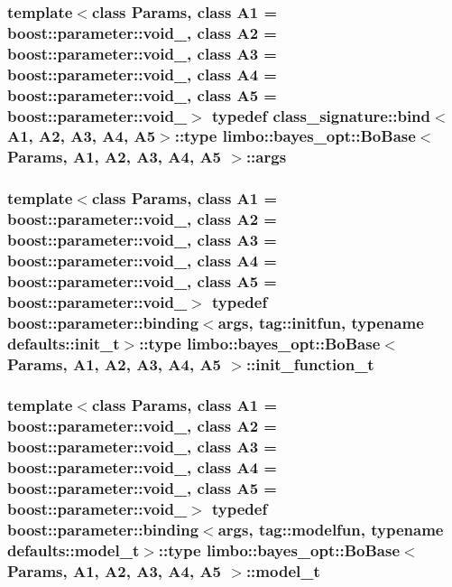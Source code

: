 \subsubsection[{args}]{\setlength{\rightskip}{0pt plus 5cm}template$<$class Params, class A1 = boost\+::parameter\+::void\+\_\+, class A2 = boost\+::parameter\+::void\+\_\+, class A3 = boost\+::parameter\+::void\+\_\+, class A4 = boost\+::parameter\+::void\+\_\+, class A5 = boost\+::parameter\+::void\+\_\+$>$ typedef class\+\_\+signature\+::bind$<$A1, A2, A3, A4, A5$>$\+::type {\bf limbo\+::bayes\+\_\+opt\+::\+Bo\+Base}$<$ Params, A1, A2, A3, A4, A5 $>$\+::{\bf args}}\label{classlimbo_1_1bayes__opt_1_1_bo_base_a75c1ae9e7268016c6f767c56bcede7d2}
\hypertarget{classlimbo_1_1bayes__opt_1_1_bo_base_aa4cf2b36051de6b46e75621f0b9ed642}{}
\subsubsection[{init\+\_\+function\+\_\+t}]{\setlength{\rightskip}{0pt plus 5cm}template$<$class Params, class A1 = boost\+::parameter\+::void\+\_\+, class A2 = boost\+::parameter\+::void\+\_\+, class A3 = boost\+::parameter\+::void\+\_\+, class A4 = boost\+::parameter\+::void\+\_\+, class A5 = boost\+::parameter\+::void\+\_\+$>$ typedef boost\+::parameter\+::binding$<${\bf args}, tag\+::initfun, typename {\bf defaults\+::init\+\_\+t}$>$\+::type {\bf limbo\+::bayes\+\_\+opt\+::\+Bo\+Base}$<$ Params, A1, A2, A3, A4, A5 $>$\+::{\bf init\+\_\+function\+\_\+t}}\label{classlimbo_1_1bayes__opt_1_1_bo_base_aa4cf2b36051de6b46e75621f0b9ed642}
\hypertarget{classlimbo_1_1bayes__opt_1_1_bo_base_a1ddc93cc023a2d7d527deb4cc750624e}{}
\subsubsection[{model\+\_\+t}]{\setlength{\rightskip}{0pt plus 5cm}template$<$class Params, class A1 = boost\+::parameter\+::void\+\_\+, class A2 = boost\+::parameter\+::void\+\_\+, class A3 = boost\+::parameter\+::void\+\_\+, class A4 = boost\+::parameter\+::void\+\_\+, class A5 = boost\+::parameter\+::void\+\_\+$>$ typedef boost\+::parameter\+::binding$<${\bf args}, tag\+::modelfun, typename {\bf defaults\+::model\+\_\+t}$>$\+::type {\bf limbo\+::bayes\+\_\+opt\+::\+Bo\+Base}$<$ Params, A1, A2, A3, A4, A5 $>$\+::{\bf model\+\_\+t}}\label{classlimbo_1_1bayes__opt_1_1_bo_base_a1ddc93cc023a2d7d527deb4cc750624e}
\hypertarget{classlimbo_1_1bayes__opt_1_1_bo_base_a3fb955ab00c385f5deb56f3d18211d3d}{}
